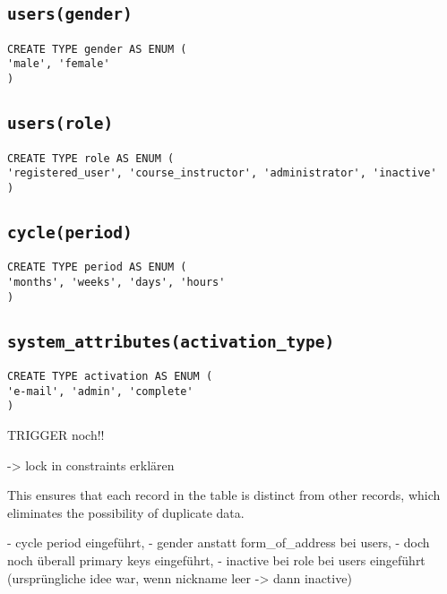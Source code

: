 \subsection{\texttt{users(gender)}}

\begin{verbatim}
CREATE TYPE gender AS ENUM (
'male', 'female'
)
\end{verbatim}

\subsection{\texttt{users(role)}}

\begin{verbatim}
CREATE TYPE role AS ENUM (
'registered_user', 'course_instructor', 'administrator', 'inactive'
)
\end{verbatim}

\subsection{\texttt{cycle(period)}}

\begin{verbatim}
CREATE TYPE period AS ENUM (
'months', 'weeks', 'days', 'hours'
)
\end{verbatim}

\subsection{\texttt{system_attributes(activation_type)}}

\begin{verbatim}
CREATE TYPE activation AS ENUM (
'e-mail', 'admin', 'complete'
)
\end{verbatim}



TRIGGER noch!!

-> lock in constraints erklären

This ensures that each record in the table is distinct from other records, which eliminates the possibility of duplicate data.


- cycle period eingeführt,
- gender anstatt form_of_address bei users,
- doch noch überall primary keys eingeführt,
- inactive bei role bei users eingeführt (ursprüngliche idee war, wenn nickname leer -> dann inactive)